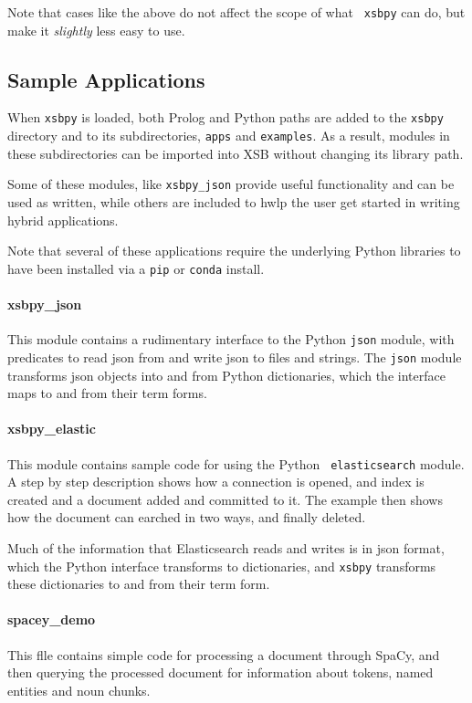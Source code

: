 Note that cases like the above do not affect the scope of what {\tt
  xsbpy} can do, but make it {\em slightly} less easy to use.

\subsection{Sample Applications}

When {\tt xsbpy} is loaded, both Prolog and Python paths are added to
the {\tt xsbpy} directory and to its subdirectories, {\tt apps} and
{\tt examples}.  As a result, modules in these subdirectories can be
imported into XSB without changing its library path.

Some of these modules, like {\tt xsbpy\_json} provide useful
functionality and can be used as written, while others are included to
hwlp the user get started in writing hybrid applications.

Note that several of these applications require the underlying Python
libraries to have been installed via a {\tt pip} or {\tt conda}
install.

\paragraph{xsbpy\_json}
This module contains a rudimentary interface to the Python {\tt json}
module, with predicates to read json from and write json to files and
strings.  The {\tt json} module transforms json objects into and from Python
dictionaries, which the interface maps to and from their term forms.

\paragraph{xsbpy\_elastic}
This module contains sample code for using the Python {\tt
  elasticsearch} module.  A step by step description shows how a
connection is opened, and index is created and a document added and
committed to it.  The example then shows how the document can earched
in two ways, and finally deleted.

Much of the information that Elasticsearch reads and writes is in json
format, which the Python interface transforms to dictionaries, and
{\tt xsbpy} transforms these dictionaries to and from their term form.

\paragraph{spacey\_demo}
This flle contains simple code for processing a document through
SpaCy, and then querying the processed document for information about
tokens, named entities and noun chunks.

